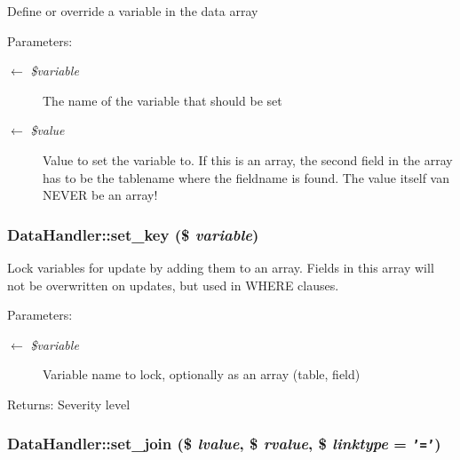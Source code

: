 Define or override a variable in the data array

\begin{Desc}
\item[Parameters:]
\begin{description}
\item[\mbox{$\leftarrow$} {\em \$variable}]The name of the variable that should be set \item[\mbox{$\leftarrow$} {\em \$value}]Value to set the variable to. If this is an array, the second field in the array has to be the tablename where the fieldname is found. The value itself van NEVER be an array! \end{description}
\end{Desc}
\hypertarget{classDataHandler_32ce223478b78a4ea9838a3c6ac7440c}{
\subsubsection{\setlength{\rightskip}{0pt plus 5cm}DataHandler::set\_\-key (\$ {\em variable})}}
\label{classDataHandler_32ce223478b78a4ea9838a3c6ac7440c}


Lock variables for update by adding them to an array. Fields in this array will not be overwritten on updates, but used in WHERE clauses. \begin{Desc}
\item[Parameters:]
\begin{description}
\item[\mbox{$\leftarrow$} {\em \$variable}]Variable name to lock, optionally as an array (table, field) \end{description}
\end{Desc}
\begin{Desc}
\item[Returns:]Severity level \end{Desc}
\hypertarget{classDataHandler_9b77733f02e9d6281fc40df110c0ba70}{
\subsubsection{\setlength{\rightskip}{0pt plus 5cm}DataHandler::set\_\-join (\$ {\em lvalue}, \$ {\em rvalue}, \$ {\em linktype} = {\tt '='})}}
\label{classDataHandler_9b77733f02e9d6281fc40df110c0ba70}


